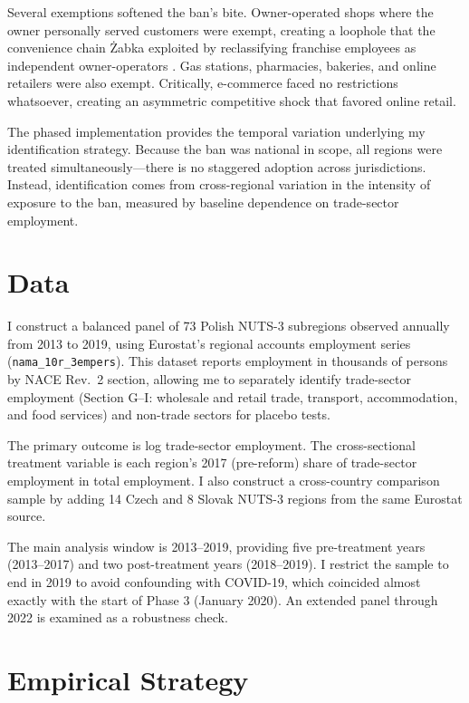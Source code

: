 \documentclass[12pt]{article}
\begin{document}
Several exemptions softened the ban's bite. Owner-operated shops where the owner personally served customers were exempt, creating a loophole that the convenience chain \.{Z}abka exploited by reclassifying franchise employees as independent owner-operators \citep{Szalonka2019}. Gas stations, pharmacies, bakeries, and online retailers were also exempt. Critically, e-commerce faced no restrictions whatsoever, creating an asymmetric competitive shock that favored online retail.

The phased implementation provides the temporal variation underlying my identification strategy. Because the ban was national in scope, all regions were treated simultaneously---there is no staggered adoption across jurisdictions. Instead, identification comes from cross-regional variation in the intensity of exposure to the ban, measured by baseline dependence on trade-sector employment.


\section{Data}
\label{sec:data}

I construct a balanced panel of 73 Polish NUTS-3 subregions observed annually from 2013 to 2019, using Eurostat's regional accounts employment series (\texttt{nama\_10r\_3empers}). This dataset reports employment in thousands of persons by NACE Rev.~2 section, allowing me to separately identify trade-sector employment (Section G--I: wholesale and retail trade, transport, accommodation, and food services) and non-trade sectors for placebo tests.

The primary outcome is log trade-sector employment. The cross-sectional treatment variable is each region's 2017 (pre-reform) share of trade-sector employment in total employment. I also construct a cross-country comparison sample by adding 14 Czech and 8 Slovak NUTS-3 regions from the same Eurostat source.

The main analysis window is 2013--2019, providing five pre-treatment years (2013--2017) and two post-treatment years (2018--2019). I restrict the sample to end in 2019 to avoid confounding with COVID-19, which coincided almost exactly with the start of Phase 3 (January 2020). An extended panel through 2022 is examined as a robustness check.




\section{Empirical Strategy}
\label{sec:strategy}
\end{document}

